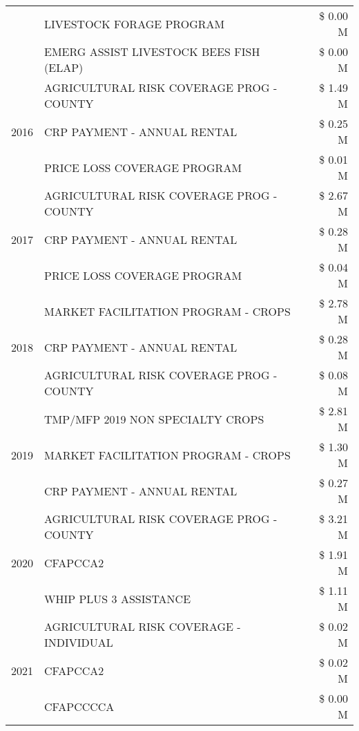 \begin{tabular}{llr}
 & LIVESTOCK FORAGE PROGRAM & \$ 0.00 M \\
 & EMERG ASSIST LIVESTOCK BEES FISH (ELAP) & \$ 0.00 M \\
\cline{1-3}
\multirow[t]{3}{*}{2016} & AGRICULTURAL RISK COVERAGE PROG - COUNTY      & \$ 1.49 M \\
 & CRP PAYMENT - ANNUAL RENTAL                   & \$ 0.25 M \\
 & PRICE LOSS COVERAGE PROGRAM                   & \$ 0.01 M \\
\cline{1-3}
\multirow[t]{3}{*}{2017} & AGRICULTURAL RISK COVERAGE PROG - COUNTY & \$ 2.67 M \\
 & CRP PAYMENT - ANNUAL RENTAL & \$ 0.28 M \\
 & PRICE LOSS COVERAGE PROGRAM & \$ 0.04 M \\
\cline{1-3}
\multirow[t]{3}{*}{2018} & MARKET FACILITATION PROGRAM - CROPS & \$ 2.78 M \\
 & CRP PAYMENT - ANNUAL RENTAL & \$ 0.28 M \\
 & AGRICULTURAL RISK COVERAGE PROG - COUNTY & \$ 0.08 M \\
\cline{1-3}
\multirow[t]{3}{*}{2019} & TMP/MFP 2019 NON SPECIALTY CROPS & \$ 2.81 M \\
 & MARKET FACILITATION PROGRAM - CROPS & \$ 1.30 M \\
 & CRP PAYMENT - ANNUAL RENTAL & \$ 0.27 M \\
\cline{1-3}
\multirow[t]{3}{*}{2020} & AGRICULTURAL RISK COVERAGE PROG - COUNTY & \$ 3.21 M \\
 & CFAPCCA2 & \$ 1.91 M \\
 & WHIP PLUS 3 ASSISTANCE & \$ 1.11 M \\
\cline{1-3}
\multirow[t]{3}{*}{2021} & AGRICULTURAL RISK COVERAGE - INDIVIDUAL & \$ 0.02 M \\
 & CFAPCCA2 & \$ 0.02 M \\
 & CFAPCCCCA & \$ 0.00 M \\
\cline{1-3}
\bottomrule
\end{tabular}
